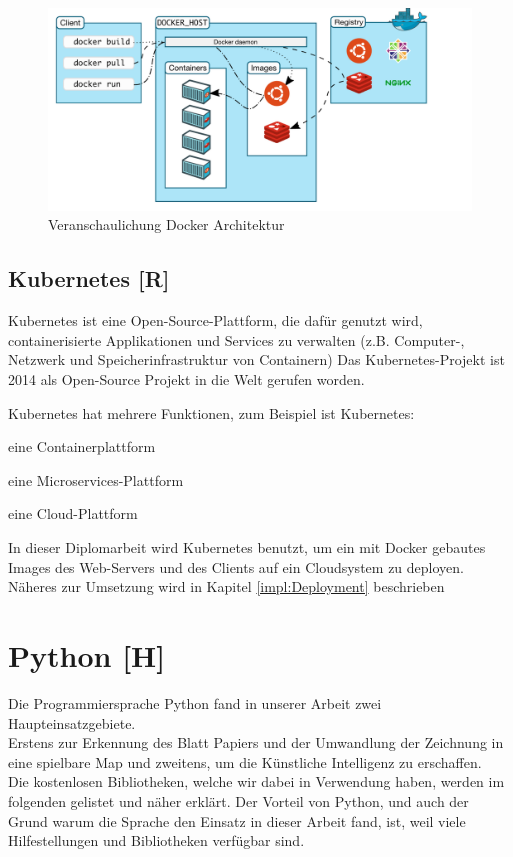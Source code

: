 \begin{figure}[H]
    \centering
    \includegraphics[scale=0.6]{pics/docker architecture.PNG}
    \caption{Veranschaulichung Docker Architektur}
\end{figure}


\subsection{Kubernetes [R]}
Kubernetes ist eine Open-Source-Plattform, die dafür genutzt wird, containerisierte Applikationen und Services zu verwalten (z.B. Computer-, Netzwerk und Speicherinfrastruktur von Containern)
Das Kubernetes-Projekt ist 2014 als Open-Source Projekt in die Welt gerufen worden.

Kubernetes hat mehrere Funktionen, zum Beispiel ist Kubernetes:
\begin{compactitem}
    \item eine Containerplattform
    \item eine Microservices-Plattform
    \item eine Cloud-Plattform
\end{compactitem}
\cite{kubernetes}

In dieser Diplomarbeit wird Kubernetes benutzt, um ein mit Docker gebautes Images des Web-Servers und des Clients auf ein Cloudsystem zu deployen. Näheres zur Umsetzung wird in Kapitel \ref{impl:Deployment} beschrieben


\newpage
\section{Python [H]}
Die Programmiersprache Python
fand in unserer Arbeit zwei Haupteinsatzgebiete. \\
Erstens zur Erkennung des Blatt Papiers und der Umwandlung der Zeichnung in eine spielbare Map
und zweitens, um die Künstliche Intelligenz zu erschaffen. \\
Die kostenlosen Bibliotheken, welche wir dabei in Verwendung haben, werden im folgenden gelistet und näher
erklärt.
Der Vorteil von Python, und auch der Grund warum die Sprache den Einsatz in dieser Arbeit fand, ist, weil
viele Hilfestellungen und Bibliotheken verfügbar sind.

